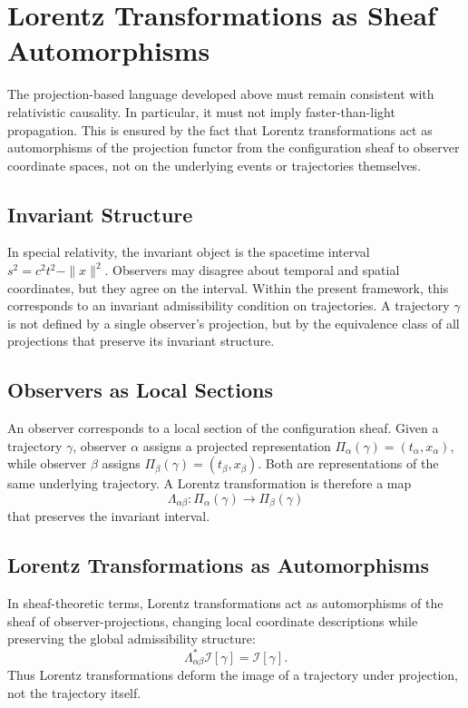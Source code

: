 \documentclass[11pt, a4paper, twocolumn]{article}
\begin{document}
\section{Lorentz Transformations as Sheaf Automorphisms}

The projection-based language developed above must remain consistent with
relativistic causality. In particular, it must not imply faster-than-light
propagation. This is ensured by the fact that Lorentz transformations act as
automorphisms of the projection functor from the configuration sheaf to observer
coordinate spaces, not on the underlying events or trajectories themselves.

\subsection{Invariant Structure}

In special relativity, the invariant object is the spacetime interval
$s^2 = c^2 t^2 - \|x\|^2$. Observers may disagree about temporal and spatial
coordinates, but they agree on the interval. Within the present framework, this
corresponds to an invariant admissibility condition on trajectories. A
trajectory $\gamma$ is not defined by a single observer's projection, but by the
equivalence class of all projections that preserve its invariant structure.

\subsection{Observers as Local Sections}

An observer corresponds to a local section of the configuration sheaf. Given a
trajectory $\gamma$, observer $\alpha$ assigns a projected representation
$\Pi_\alpha(\gamma) = (t_\alpha,x_\alpha)$, while observer $\beta$ assigns
$\Pi_\beta(\gamma) = (t_\beta,x_\beta)$. Both are representations of the same
underlying trajectory. A Lorentz transformation is therefore a map
\[
    \Lambda_{\alpha\beta} :
    \Pi_\alpha(\gamma) \longrightarrow \Pi_\beta(\gamma)
\]
that preserves the invariant interval.

\subsection{Lorentz Transformations as Automorphisms}

In sheaf-theoretic terms, Lorentz transformations act as automorphisms of the
sheaf of observer-projections, changing local coordinate descriptions while
preserving the global admissibility structure:
\[
    \Lambda_{\alpha\beta}^* \mathcal{I}[\gamma]
    =
    \mathcal{I}[\gamma].
\]
Thus Lorentz transformations deform the image of a trajectory under projection,
not the trajectory itself.
\end{document}

